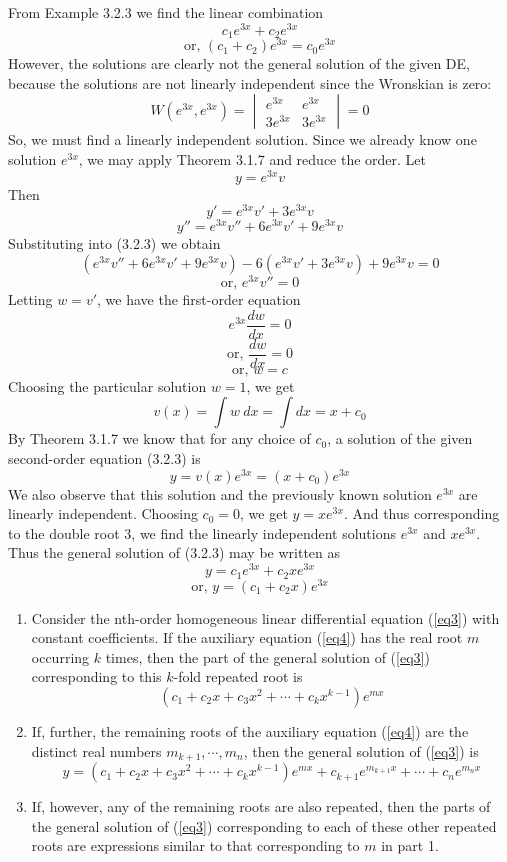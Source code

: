 From Example 3.2.3 we find the linear combination \[
    c_1e^{3x} + c_2e^{3x}
\] \[ \text{or, } (c_1 + c_2)e^{3x} = c_0e^{3x} \]
However, the solutions are clearly not the general solution of the given DE, because the solutions are not linearly independent since the Wronskian is zero:\[
    W(e^{3x}, e^{3x}) =
    \begin{vmatrix}
        e^{3x} & e^{3x} \\
        3e^{3x} & 3e^{3x}
    \end{vmatrix} = 0
\]
So, we must find a linearly independent solution. Since we already know one solution $e^{3x}$, we may apply Theorem 3.1.7 and reduce the order. Let \[
    y = e^{3x}v
\] Then \[
    y' = e^{3x}v' + 3e^{3x}v
\] \[ y'' = e^{3x}v'' + 6e^{3x}v' + 9e^{3x}v \]
Substituting into (3.2.3) we obtain \[
    ( e^{3x}v'' + 6e^{3x}v' + 9e^{3x}v ) - 6( e^{3x}v' + 3e^{3x}v ) + 9e^{3x}v = 0
\] \[ \text{or, } e^{3x}v'' = 0 \]
Letting $w = v'$, we have the first-order equation \[
    e^{3x}\frac{dw}{dx} = 0
\] \[ \text{or, } \frac{dw}{dx} = 0 \]
\[ \text{or, } w = c \]
Choosing the particular solution $w = 1$, we get \[
    v(x) = \int{w} \: d{x} = \int{} d{x} = x + c_0
\]
By Theorem 3.1.7 we know that for any choice of $c_0$, a solution of the given second-order equation (3.2.3) is \[
    y = v(x)e^{3x} = (x + c_0)e^{3x}
\] We also observe that this solution and the previously known solution $e^{3x}$ are linearly independent. Choosing $c_0 = 0$, we get $y = xe^{3x}$. And thus corresponding to the double root 3, we find the linearly independent solutions $e^{3x}$ and $xe^{3x}$.
Thus the general solution of (3.2.3) may be written as \[
    y = c_1e^{3x} + c_2xe^{3x} \]
\[ \text{or, } y = (c_1 + c_2x)e^{3x} \]

\begin{theorem}{}{}
    \begin{enumerate}
        \item Consider the nth-order homogeneous linear differential equation (\ref{eq3}) with constant coefficients. If the auxiliary equation (\ref{eq4}) has the real root $m$ occurring $k$ times, then the part of the general solution of (\ref{eq3}) corresponding to this $k$-fold repeated root is \[
            (c_1 + c_2x + c_3x^2 + \cdots + c_kx^{k-1})e^{mx}
        \]
        \item If, further, the remaining roots of the auxiliary equation (\ref{eq4}) are the distinct real numbers $m_{k+1}, \cdots, m_n$, then the general solution of (\ref{eq3}) is \[
            y = (c_1 + c_2x + c_3x^2 + \cdots + c_kx^{k-1})e^{mx} + c_{k+1}e^{m_{k+1}x} + \cdots + c_ne^{m_nx}
        \]
        \item If, however, any of the remaining roots are also repeated, then the parts of the general solution of (\ref{eq3}) corresponding to each of these other repeated roots are expressions similar to that corresponding to $m$ in part 1.
    \end{enumerate}
\end{theorem}

